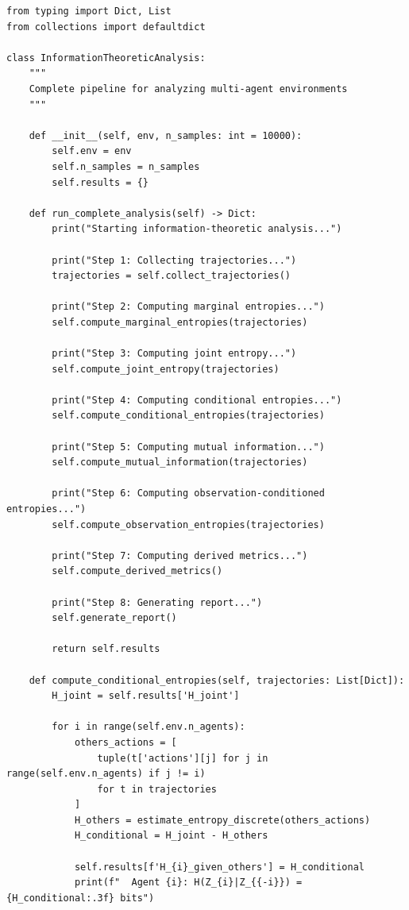 \documentclass[10pt, letterpaper]{article}
\begin{document}
\begin{lstlisting}
from typing import Dict, List
from collections import defaultdict

class InformationTheoreticAnalysis:
    """
    Complete pipeline for analyzing multi-agent environments
    """

    def __init__(self, env, n_samples: int = 10000):
        self.env = env
        self.n_samples = n_samples
        self.results = {}

    def run_complete_analysis(self) -> Dict:
        print("Starting information-theoretic analysis...")

        print("Step 1: Collecting trajectories...")
        trajectories = self.collect_trajectories()

        print("Step 2: Computing marginal entropies...")
        self.compute_marginal_entropies(trajectories)

        print("Step 3: Computing joint entropy...")
        self.compute_joint_entropy(trajectories)

        print("Step 4: Computing conditional entropies...")
        self.compute_conditional_entropies(trajectories)

        print("Step 5: Computing mutual information...")
        self.compute_mutual_information(trajectories)

        print("Step 6: Computing observation-conditioned entropies...")
        self.compute_observation_entropies(trajectories)

        print("Step 7: Computing derived metrics...")
        self.compute_derived_metrics()

        print("Step 8: Generating report...")
        self.generate_report()

        return self.results

    def compute_conditional_entropies(self, trajectories: List[Dict]):
        H_joint = self.results['H_joint']

        for i in range(self.env.n_agents):
            others_actions = [
                tuple(t['actions'][j] for j in range(self.env.n_agents) if j != i)
                for t in trajectories
            ]
            H_others = estimate_entropy_discrete(others_actions)
            H_conditional = H_joint - H_others

            self.results[f'H_{i}_given_others'] = H_conditional
            print(f"  Agent {i}: H(Z_{i}|Z_{{-i}}) = {H_conditional:.3f} bits")
\end{lstlisting}
\end{document}
